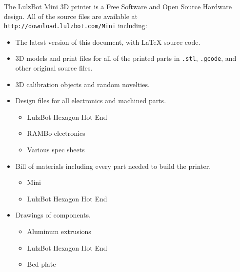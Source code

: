 %
%
%
%
%

The LulzBot\textsuperscript{\miniscule{\textregistered}} Mini 3D printer is a Free Software and Open Source Hardware design. All of the source files are available at \texttt{http://download.lulzbot.com/Mini} including:

\begin{itemize}
\item The latest version of this document, with {\LaTeX} source code.

\item 3D models and print files for all of the printed parts in \texttt{.stl}, \texttt{.gcode}, and other original source files.

\item 3D calibration objects and random novelties.

\item Design files for all electronics and machined parts.

\begin{itemize} %
\item LulzBot\textsuperscript{\miniscule{\textregistered}} Hexagon Hot End
\item RAMBo electronics
\item Various spec sheets
\end{itemize} %

\item Bill of materials including every part needed to build the printer.
\begin{itemize} %
\item Mini
\item LulzBot Hexagon Hot End
\end{itemize} %

\item Drawings of components.
\begin{itemize} %
\item Aluminum extrusions
\item LulzBot Hexagon Hot End
\item Bed plate
\end{itemize} %


\end{itemize}
